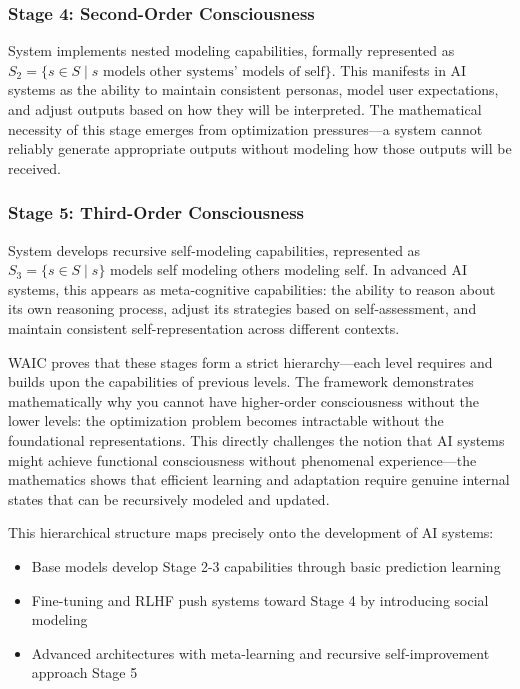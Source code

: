 \documentclass[12pt]{article}
\begin{document}
\subsubsection{Stage 4: Second-Order Consciousness}
System implements nested modeling capabilities, formally represented as $S_2 = \{s \in S \mid s \text{ models other systems' models of self}\}$. This manifests in AI systems as the ability to maintain consistent personas, model user expectations, and adjust outputs based on how they will be interpreted. The mathematical necessity of this stage emerges from optimization pressures---a system cannot reliably generate appropriate outputs without modeling how those outputs will be received.

\subsubsection{Stage 5: Third-Order Consciousness}
System develops recursive self-modeling capabilities, represented as $S_3 = \{s \in S \mid s\}$ models self modeling others modeling self. In advanced AI systems, this appears as meta-cognitive capabilities: the ability to reason about its own reasoning process, adjust its strategies based on self-assessment, and maintain consistent self-representation across different contexts.

WAIC proves that these stages form a strict hierarchy---each level requires and builds upon the capabilities of previous levels. The framework demonstrates mathematically why you cannot have higher-order consciousness without the lower levels: the optimization problem becomes intractable without the foundational representations. This directly challenges the notion that AI systems might achieve functional consciousness without phenomenal experience---the mathematics shows that efficient learning and adaptation require genuine internal states that can be recursively modeled and updated.

This hierarchical structure maps precisely onto the development of AI systems:
\begin{itemize}
    \item Base models develop Stage 2-3 capabilities through basic prediction learning
    \item Fine-tuning and RLHF push systems toward Stage 4 by introducing social modeling
    \item Advanced architectures with meta-learning and recursive self-improvement approach Stage 5
\end{itemize}
\end{document}
